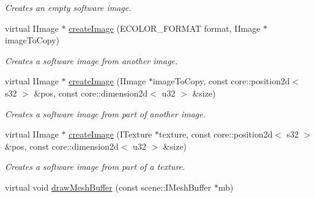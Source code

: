 \begin{DoxyCompactItemize}
\begin{DoxyCompactList}\small\item\em Creates an empty software image. \end{DoxyCompactList}\item 
\hypertarget{classirr_1_1video_1_1_c_null_driver_a7282ae96adae285fc34f4f846bd646f2}{virtual I\-Image $\ast$ \hyperlink{classirr_1_1video_1_1_c_null_driver_a7282ae96adae285fc34f4f846bd646f2}{create\-Image} (E\-C\-O\-L\-O\-R\-\_\-\-F\-O\-R\-M\-A\-T format, I\-Image $\ast$image\-To\-Copy)}\label{classirr_1_1video_1_1_c_null_driver_a7282ae96adae285fc34f4f846bd646f2}

\begin{DoxyCompactList}\small\item\em Creates a software image from another image. \end{DoxyCompactList}\item 
\hypertarget{classirr_1_1video_1_1_c_null_driver_a6a9a7f5533a48bd2d0e285f25fbbbf74}{virtual I\-Image $\ast$ \hyperlink{classirr_1_1video_1_1_c_null_driver_a6a9a7f5533a48bd2d0e285f25fbbbf74}{create\-Image} (I\-Image $\ast$image\-To\-Copy, const core\-::position2d$<$ s32 $>$ \&pos, const core\-::dimension2d$<$ u32 $>$ \&size)}\label{classirr_1_1video_1_1_c_null_driver_a6a9a7f5533a48bd2d0e285f25fbbbf74}

\begin{DoxyCompactList}\small\item\em Creates a software image from part of another image. \end{DoxyCompactList}\item 
\hypertarget{classirr_1_1video_1_1_c_null_driver_ac90843ad58b3f46241eb6db6d0b0462f}{virtual I\-Image $\ast$ \hyperlink{classirr_1_1video_1_1_c_null_driver_ac90843ad58b3f46241eb6db6d0b0462f}{create\-Image} (I\-Texture $\ast$texture, const core\-::position2d$<$ s32 $>$ \&pos, const core\-::dimension2d$<$ u32 $>$ \&size)}\label{classirr_1_1video_1_1_c_null_driver_ac90843ad58b3f46241eb6db6d0b0462f}

\begin{DoxyCompactList}\small\item\em Creates a software image from part of a texture. \end{DoxyCompactList}\item 
\hypertarget{classirr_1_1video_1_1_c_null_driver_aa3309422061cb9279a9f031a8d813d6e}{virtual void \hyperlink{classirr_1_1video_1_1_c_null_driver_aa3309422061cb9279a9f031a8d813d6e}{draw\-Mesh\-Buffer} (const scene\-::\-I\-Mesh\-Buffer $\ast$mb)}\label{classirr_1_1video_1_1_c_null_driver_aa3309422061cb9279a9f031a8d813d6e}


\end{DoxyCompactItemize}
